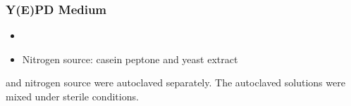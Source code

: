 \subsubsection{Y(E)PD Medium}
\begin{itemize}
	\item {} \GLC{}
	\item Nitrogen source: 
		 casein peptone and
		 yeast extract
\end{itemize}
\GLC{} and nitrogen source were autoclaved separately. The autoclaved solutions were mixed under sterile conditions.

